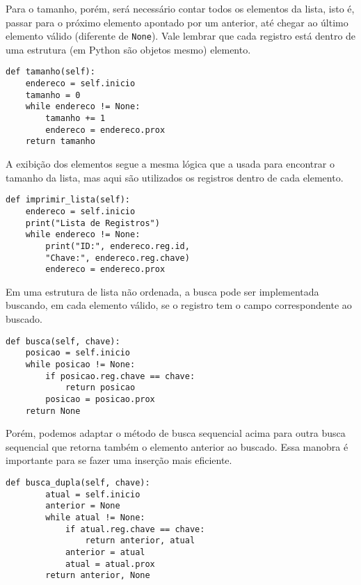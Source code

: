 \documentclass[a4paper, twocolumn]{article}
\theoremstyle{definition}
\begin{document}
Para o tamanho, porém, será necessário contar todos os elementos da lista, isto é, passar para o próximo elemento apontado por um anterior, até chegar ao último elemento válido (diferente de \texttt{None}). Vale lembrar que cada registro está dentro de uma estrutura (em Python são objetos mesmo) elemento.

\begin{lstlisting}[label=lista_ligada_din_tamanho, caption= Lista Ligada dinâmica (tamanho)]
def tamanho(self):
    endereco = self.inicio
    tamanho = 0
    while endereco != None:
        tamanho += 1
        endereco = endereco.prox
    return tamanho
\end{lstlisting}

A exibição dos elementos segue a mesma lógica que a usada para encontrar o tamanho da lista, mas aqui são utilizados os registros dentro de cada elemento.

\begin{lstlisting}[label=lista_ligada_din_exibir, caption= Lista Ligada dinâmica (exibição)]
def imprimir_lista(self):
    endereco = self.inicio
    print("Lista de Registros")
    while endereco != None:
        print("ID:", endereco.reg.id, 
        "Chave:", endereco.reg.chave)
        endereco = endereco.prox
\end{lstlisting}

Em uma estrutura de lista não ordenada, a busca pode ser implementada buscando, em cada elemento válido, se o registro tem o campo correspondente ao buscado.

\begin{lstlisting}[label=lista_ligada_din_busca, caption= Lista Ligada dinâmica (busca sequencial)]
def busca(self, chave):
    posicao = self.inicio
    while posicao != None:
        if posicao.reg.chave == chave:
            return posicao
        posicao = posicao.prox
    return None
\end{lstlisting}

Porém, podemos adaptar o método de busca sequencial acima para outra busca sequencial que retorna também o elemento anterior ao buscado. Essa manobra é importante para se fazer uma inserção mais eficiente.

\begin{lstlisting}[label=lista_ligada_din_busca_dupla, caption= Lista Ligada dinâmica (busca o anterior e atual)]
    def busca_dupla(self, chave):
        atual = self.inicio
        anterior = None
        while atual != None:
            if atual.reg.chave == chave:
                return anterior, atual
            anterior = atual
            atual = atual.prox
        return anterior, None
\end{lstlisting}
\end{document}
